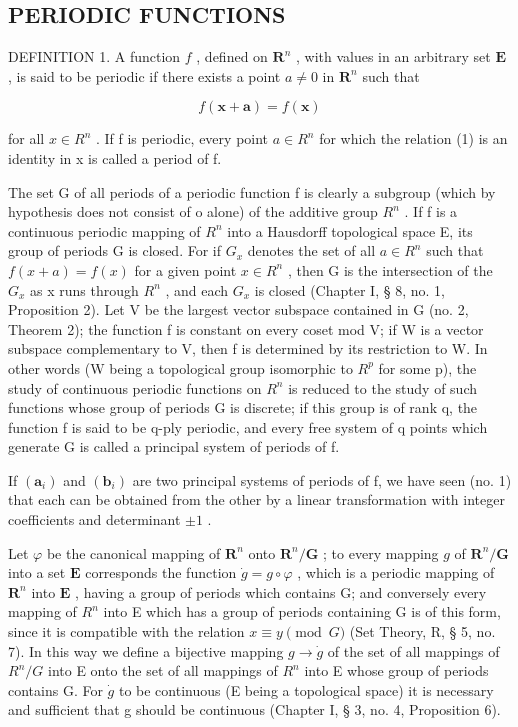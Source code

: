 \subsection{PERIODIC FUNCTIONS}

DEFINITION 1. A function \(f\) , defined on \(\mathbf{R}^n\) , with values in an arbitrary set \(\mathbf{E}\) , is said to be periodic if there exists a point \(a \neq 0\) in \(\mathbf{R}^n\) such that

\[
f (\boldsymbol {x} + \boldsymbol {a}) = f (\boldsymbol {x})\tag{1}
\]

for all \(x \in R^{n}\) . If f is periodic, every point \(a \in R^{n}\) for which the relation (1) is an identity in x is called a period of f.

The set G of all periods of a periodic function f is clearly a subgroup (which by hypothesis does not consist of o alone) of the additive group \(R^{n}\) . If f is a continuous periodic mapping of \(R^{n}\) into a Hausdorff topological space E, its group of periods G is closed. For if \(G_{x}\) denotes the set of all \(a \in R^{n}\) such that \(f(x + a) = f(x)\) for a given point \(x \in R^{n}\) , then G is the intersection of the \(G_{x}\) as x runs through \(R^{n}\) , and each \(G_{x}\) is closed (Chapter I, § 8, no. 1, Proposition 2). Let V be the largest vector subspace contained in G (no. 2, Theorem 2); the function f is constant on every coset mod V; if W is a vector subspace complementary to V, then f is determined by its restriction to W. In other words (W being a topological group isomorphic to \(R^{p}\) for some p), the study of continuous periodic functions on \(R^{n}\) is reduced to the study of such functions whose group of periods G is discrete; if this group is of rank q, the function f is said to be q-ply periodic, and every free system of q points which generate G is called a principal system of periods of f.

If \((\boldsymbol{a}_{i})\) and \((\boldsymbol{b}_{i})\) are two principal systems of periods of f, we have seen (no. 1) that each can be obtained from the other by a linear transformation with integer coefficients and determinant \(\pm1\) .

Let \(\varphi\) be the canonical mapping of \(\mathbf{R}^n\) onto \(\mathbf{R}^n/\mathbf{G}\) ; to every mapping \(g\) of \(\mathbf{R}^n/\mathbf{G}\) into a set \(\mathbf{E}\) corresponds the function \(\dot{g}=g\circ\varphi\) , which is a periodic mapping of \(\mathbf{R}^n\) into \(\mathbf{E}\) , having a group of periods which contains G; and conversely every mapping of \(R^{n}\) into E which has a group of periods containing G is of this form, since it is compatible with the relation \(x \equiv y \pmod{G}\) (Set Theory, R, § 5, no. 7). In this way we define a bijective mapping \(g \to \dot{g}\) of the set of all mappings of \(R^{n}/G\) into E onto the set of all mappings of \(R^{n}\) into E whose group of periods contains G. For \(\dot{g}\) to be continuous (E being a topological space) it is necessary and sufficient that g should be continuous (Chapter I, § 3, no. 4, Proposition 6).

